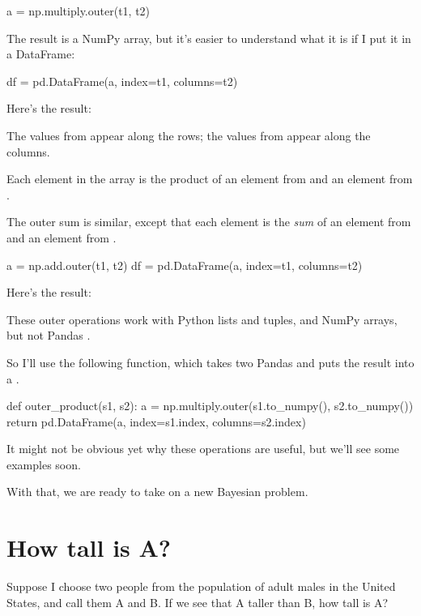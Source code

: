 \documentclass[12pt]{book}
\theoremstyle{exercise}
\begin{document}
\begin{code}
a = np.multiply.outer(t1, t2)
\end{code}

The result is a NumPy array, but it's easier to understand what it is if I put it in a DataFrame:

\begin{code}
df = pd.DataFrame(a, index=t1, columns=t2)
\end{code}

Here's the result:



The values from  appear along the rows; the values from  appear along the columns.  

Each element in the array is the product of an element from  and an element from .

The outer sum is similar, except that each element is the {\em sum} of an element from  and an element from .

\begin{code}
a = np.add.outer(t1, t2)
df = pd.DataFrame(a, index=t1, columns=t2)
\end{code}

Here's the result:



These outer operations work with Python lists and tuples, and NumPy arrays, but not Pandas .

So I'll use the following function, which takes two Pandas  and puts the result into a .

\begin{code}
def outer_product(s1, s2):
    a = np.multiply.outer(s1.to_numpy(), s2.to_numpy())
    return pd.DataFrame(a, index=s1.index, columns=s2.index)
\end{code}

It might not be obvious yet why these operations are useful, but we'll see some examples soon.

With that, we are ready to take on a new Bayesian problem.

\section{How tall is A?}

Suppose I choose two people from the population of adult males in the United States, and call them A and B.  If we see that A taller than B, how tall is A?
\end{document}
